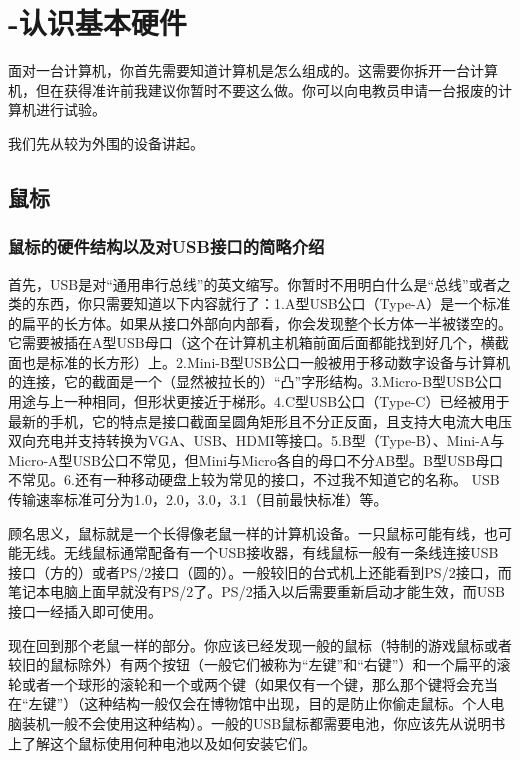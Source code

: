 \section{-认识基本硬件}
面对一台计算机，你首先需要知道计算机是怎么组成的。这需要你拆开一台计算机，但在获得准许前我建议你暂时不要这么做。你可以向电教员申请一台报废的计算机进行试验。\par
我们先从较为外围的设备讲起。
\subsection{鼠标}
\subsubsection{鼠标的硬件结构以及对USB接口的简略介绍}
首先，USB是对“通用串行总线”的英文缩写。你暂时不用明白什么是“总线”或者之类的东西，你只需要知道以下内容就行了：1.A型USB公口（Type-A）是一个标准的扁平的长方体。如果从接口外部向内部看，你会发现整个长方体一半被镂空的。它需要被插在A型USB母口（这个在计算机主机箱前面后面都能找到好几个，横截面也是标准的长方形）上。2.Mini-B型USB公口一般被用于移动数字设备与计算机的连接，它的截面是一个（显然被拉长的）“凸”字形结构。3.Micro-B型USB公口用途与上一种相同，但形状更接近于梯形。4.C型USB公口（Type-C）已经被用于最新的手机，它的特点是接口截面呈圆角矩形且不分正反面，且支持大电流大电压双向充电并支持转换为VGA、USB、HDMI等接口。5.B型（Type-B）、Mini-A与Micro-A型USB公口不常见，但Mini与Micro各自的母口不分AB型。B型USB母口不常见。6.还有一种移动硬盘上较为常见的接口，不过我不知道它的名称。 USB传输速率标准可分为1.0，2.0，3.0，3.1（目前最快标准）等。\par
顾名思义，鼠标就是一个长得像老鼠一样的计算机设备。一只鼠标可能有线，也可能无线。无线鼠标通常配备有一个USB接收器，有线鼠标一般有一条线连接USB接口（方的）或者PS/2接口（圆的）。一般较旧的台式机上还能看到PS/2接口，而笔记本电脑上面早就没有PS/2了。PS/2插入以后需要重新启动才能生效，而USB接口一经插入即可使用。\par
现在回到那个老鼠一样的部分。你应该已经发现一般的鼠标（特制的游戏鼠标或者较旧的鼠标除外）有两个按钮（一般它们被称为“左键”和“右键”）和一个扁平的滚轮或者一个球形的滚轮和一个或两个键（如果仅有一个键，那么那个键将会充当在“左键”）（这种结构一般仅会在博物馆中出现，目的是防止你偷走鼠标。个人电脑装机一般不会使用这种结构）。一般的USB鼠标都需要电池，你应该先从说明书上了解这个鼠标使用何种电池以及如何安装它们。

